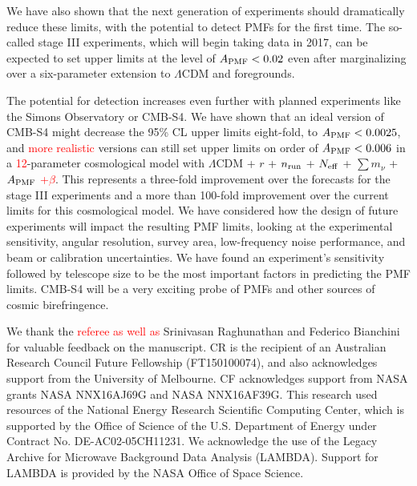 \documentclass[apj]{emulateapj}
\newcommand{\apmf}{\ensuremath{A_{\rm PMF}}}
\newcommand{\lcdm}{\ensuremath{\Lambda}CDM}
\newcommand{\nrun}{\ensuremath{n_{\rm run}}}
\newcommand{\neff}{\ensuremath{N_{\rm eff}}}
\newcommand{\mnu}{\ensuremath{\sum m_\nu}}
\newcommand{\changed}[1]{\textcolor{Red}{#1}}
\begin{document}
We have also shown that the next generation of experiments should dramatically reduce these limits, with the potential to detect PMFs for the first time. 
The so-called stage III experiments, which will begin taking data in 2017, can be expected to set upper limits at the level of $\apmf < 0.02$ even after marginalizing over a six-parameter extension to \lcdm{} and foregrounds. 

The potential for detection increases even further with planned experiments like the Simons Observatory or CMB-S4. 
We have shown that an ideal version of CMB-S4 might decrease the 95\% CL upper limits eight-fold, to $\apmf < 0.0025$, and \changed{more realistic} versions can still set upper limits on order of $\apmf < 0.006$ in a \changed{12}-parameter cosmological model with  \lcdm{} +  $r$ + \nrun{} +  \neff{} + \mnu{} + \apmf{} \changed{+$\beta$}. 
This represents a three-fold improvement over the forecasts for the stage III experiments and a more than 100-fold improvement over the current limits for this cosmological model. 
We have considered how the design of future experiments will impact the resulting PMF limits, looking at the experimental sensitivity, angular resolution, survey area, low-frequency noise performance, and beam or calibration uncertainties. 
We have found an experiment's sensitivity followed by telescope size to be the most important factors in predicting the PMF limits. 
CMB-S4 will be a very exciting probe of PMFs and other sources of cosmic birefringence. 

\acknowledgments

We thank the \changed{referee as well as} Srinivasan Raghunathan and Federico Bianchini for valuable feedback on the manuscript. 
CR is the recipient of an Australian Research Council Future Fellowship (FT150100074), and also acknowledges support from the University of Melbourne. 
CF acknowledges support from NASA grants NASA NNX16AJ69G and NASA NNX16AF39G. 
This research used resources of the National Energy Research Scientific Computing Center, which is supported by the Office of Science of the U.S. Department of Energy under Contract No. DE-AC02-05CH11231. 
We acknowledge the use of the Legacy Archive for Microwave Background Data Analysis (LAMBDA). Support for LAMBDA is provided by the NASA Office of Space Science.



\end{document}
